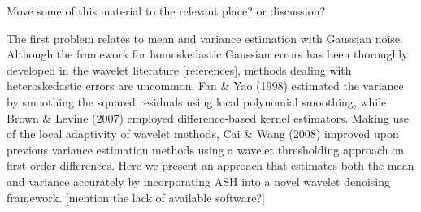 \documentclass[12pt]{article}
\begin{document}

Move some of this material to the relevant place? or discussion?

The first problem relates to mean and variance estimation with Gaussian noise. Although the framework for homoskedastic Gaussian errors has been thoroughly developed in the wavelet literature [references], methods dealing with heteroskedastic errors are uncommon. Fan \& Yao (1998) estimated the variance by smoothing the squared residuals using local polynomial smoothing, while Brown \& Levine (2007) employed difference-based kernel estimators. Making use of the local adaptivity of wavelet methods, Cai \& Wang (2008) improved upon previous variance estimation methods using a wavelet thresholding approach on first order differences. Here we present an approach that estimates both the mean and variance accurately by incorporating ASH into a novel wavelet denoising framework. [mention the lack of available software?]
\end{document}
